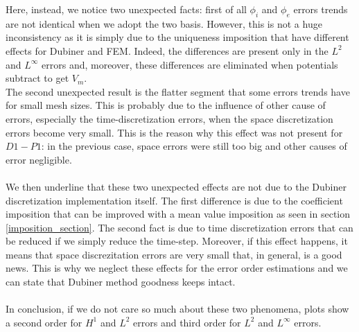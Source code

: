 \documentclass[a4paper,11pt]{article}
\begin{document}
\newpage
\noindent Here, instead, we notice two unexpected facts: first of all $\phi_i$ and $\phi_e$ errors trends are not identical when we adopt the two basis. However, this is not a huge inconsistency as it is simply due to the uniqueness imposition that have different effects for Dubiner and FEM. Indeed, the differences are present only in the $L^2$ and $L^\infty$ errors and, moreover, these differences are eliminated when potentials subtract to get $V_m$. \\
The second unexpected result is the flatter segment that some errors trends have for small mesh sizes. This is probably due to the influence of other cause of errors, especially the time-discretization errors, when the space discretization errors become very small. This is the reason why this effect was not present for $D1-P1$: in the previous case, space errors were still too big and other causes of error negligible. \\ \\
We then underline that these two unexpected effects are not due to the Dubiner discretization implementation itself. The first difference is due to the coefficient imposition that can be improved with a mean value imposition as seen in section \ref{imposition_section}. The second fact is due to time discretization errors that can be reduced if we simply reduce the time-step. Moreover, if this effect happens, it means that space discrezitation errors are very small that, in general, is a good news. This is why we neglect these effects for the error order estimations and we can state that Dubiner method goodness keeps intact. \\ \\
In conclusion, if we do not care so much about these two phenomena, plots show a second order for $H^1$ and $L^2$ errors and third order for $L^2$ and $L^\infty$ errors.
\vspace{4mm}
\end{document}

